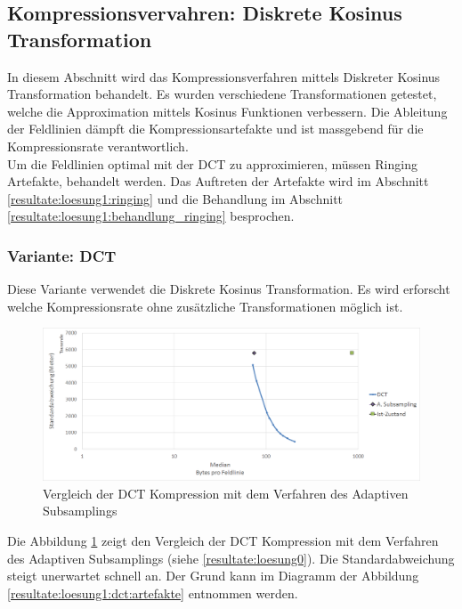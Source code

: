 \subsection{Kompressionsvervahren: Diskrete Kosinus Transformation} \label{resultate:loesung1}
In diesem Abschnitt wird das Kompressionsverfahren mittels Diskreter Kosinus Transformation behandelt. Es wurden verschiedene Transformationen getestet, welche die Approximation mittels Kosinus Funktionen verbessern. Die Ableitung der Feldlinien dämpft die Kompressionsartefakte und ist massgebend für die Kompressionsrate verantwortlich.\\
Um die Feldlinien optimal mit der DCT zu approximieren, müssen Ringing Artefakte, behandelt werden. Das Auftreten der Artefakte wird im Abschnitt \ref{resultate:loesung1:ringing} und die Behandlung im Abschnitt \ref{resultate:loesung1:behandlung_ringing} besprochen.

\subsubsection{Variante: DCT}\label{resultate:dct}
Diese Variante verwendet die Diskrete Kosinus Transformation. Es wird erforscht welche Kompressionsrate ohne zusätzliche Transformationen möglich ist.

\begin{figure}[!htbp]
	\center
	\includegraphics[width=1\textwidth,keepaspectratio]{./pictures/resultate/loesung1/loesung1-0/loesung1_0.png}
	\caption{Vergleich der DCT Kompression mit dem Verfahren des Adaptiven Subsamplings}
	\label{resultate:loesung1:dct:resultate}
\end{figure}
Die Abbildung \ref{resultate:loesung1:dct:resultate} zeigt den Vergleich der DCT Kompression mit dem Verfahren des Adaptiven Subsamplings (siehe \ref{resultate:loesung0}). Die Standardabweichung steigt unerwartet schnell an. Der Grund kann im Diagramm der Abbildung \ref{resultate:loesung1:dct:artefakte} entnommen werden. 

